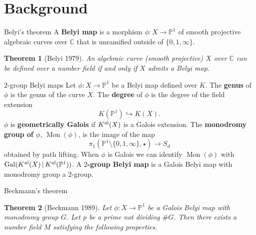 \documentclass[xcolor=dvipsnames]{beamer}
\theoremstyle{plain}
\newtheorem*{thm}{Theorem}
\newcommand{\PP}{\mathbb P}
\newcommand{\CC}{\mathbb C}
\newcommand{\Kal}{{{K}^{\textup{al}}}}
\DeclareMathOperator{\Mon}{Mon}
\DeclareMathOperator{\Gal}{Gal}
\begin{document}
  \section{Background}{
    \begin{frame}{Belyi's theorem}
      A \textbf{Belyi map}
      is a morphism
      $\phi\colon X\to\PP^1$
      of smooth projective algebraic curves
      over $\CC$
      that is unramified outside of
      $\{0,1,\infty\}$.
      \pause
      \begin{thm}[Belyi 1979]
        \vspace{1pt}
        An algebraic curve (smooth projective)
        $X$ over $\CC$ can be defined over a number
        field if and only if $X$ admits a
        Belyi map.
      \end{thm}
    \end{frame}
    \begin{frame}{$2$-group Belyi maps}
      Let $\phi\colon X\to\PP^1$ be a Belyi map
      defined over $K$.
      \pause\newline
      The \textbf{genus} of $\phi$ is the genus
      of the curve $X$.
      \pause\newline
      The \textbf{degree} of $\phi$
      is the degree of the field extension
      \[
        K(\PP^1)\hookrightarrow K(X).
      \]
      \pause
      $\phi$ is \textbf{geometrically Galois}
      if $\Kal(X)$ is a Galois extension.
      \pause\newline
      The \textbf{monodromy group of $\phi$},
      $\Mon(\phi)$,
      is the image of the map
      \[
        \pi_1(\PP^1\setminus\{0,1,\infty\},\star)
        \to S_d
      \]
      obtained by path lifting.
      \pause\newline
      When $\phi$ is Galois we
      can identify $\Mon(\phi)$ with
      $\Gal(\Kal(X)\,|\,\Kal(\PP^1))$.
      \pause\newline
      A \textbf{$2$-group Belyi map} is a
      Galois Belyi map with monodromy group
      a $2$-group.
    \end{frame}
    \begin{frame}{Beckmann's theorem}
      \begin{thm}[Beckmann 1989]
        \vspace{1pt}
        Let $\phi\colon X\to\PP^1$ be a Galois
        Belyi map with monodromy group $G$.
        Let $p$ be a prime not dividing
        $\#G$.
        \pause\newline
        Then there exists a number field $M$
        satisfying the following properties.

\end{thm}
\end{frame}}
\end{document}
